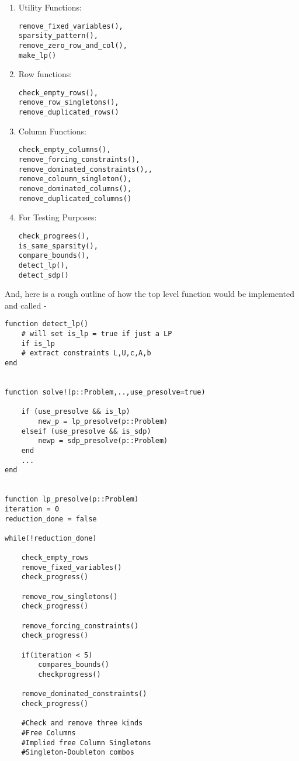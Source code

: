 \documentclass[twoside]{article}
\begin{document}
\begin{multicols}{2}
\begin{enumerate}
\item Utility Functions:
\begin{verbatim}
remove_fixed_variables(),
sparsity_pattern(),
remove_zero_row_and_col(),
make_lp()
\end{verbatim}
\item Row functions:
\begin{verbatim} 
check_empty_rows(),
remove_row_singletons(),
remove_duplicated_rows()
\end{verbatim}
\item Column Functions:
 \begin{verbatim}
check_empty_columns(),
remove_forcing_constraints(),
remove_dominated_constraints(),,
remove_coloumn_singleton(),
remove_dominated_columns(),
remove_duplicated_columns()
 \end{verbatim}
\item For Testing Purposes:
\begin{verbatim}
check_progrees(),
is_same_sparsity(),
compare_bounds(),
detect_lp(),
detect_sdp()
\end{verbatim}
\end{enumerate}

And, here is a rough outline of how the top level function would be implemented and called - 

\begin{Verbatim}[obeytabs]
function detect_lp()
	# will set is_lp = true if just a LP
	if is_lp
	# extract constraints L,U,c,A,b
end


function solve!(p::Problem,..,use_presolve=true)

	if (use_presolve && is_lp)
		new_p = lp_presolve(p::Problem)
	elseif (use_presolve && is_sdp)
		newp = sdp_presolve(p::Problem)
	end
	...
end


function lp_presolve(p::Problem)
iteration = 0
reduction_done = false

while(!reduction_done)

	check_empty_rows
	remove_fixed_variables()
	check_progress()
	
	remove_row_singletons()
	check_progress()

	remove_forcing_constraints()
	check_progress()

	if(iteration < 5)
		compares_bounds()
		checkprogress()

	remove_dominated_constraints()
	check_progress()
	
	#Check and remove three kinds
	#Free Columns
	#Implied free Column Singletons
	#Singleton-Doubleton combos
	

\end{Verbatim}
\end{multicols}
\end{document}
